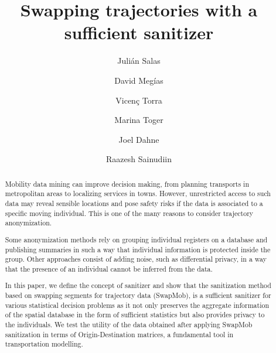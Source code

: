 \documentclass{llncs}
\begin{document}
\title{Swapping trajectories with a sufficient sanitizer}
\author{Juli\'an Salas
\and David Meg\'ias \and Vicen\c{c} Torra \and Marina Toger \and Joel Dahne \and Raazesh Sainudiin}


\maketitle

\begin{abstract}

Mobility data mining can improve decision making, from planning transports in metropolitan areas to localizing services in towns.
However, unrestricted access to such data may reveal sensible locations and pose safety risks if the data is associated to a specific moving individual. This is one of the many reasons to consider trajectory anonymization.


Some anonymization methods rely on grouping individual registers on a database and publishing summaries in such a way that individual information is protected inside the group.
Other approaches consist of adding noise, such as differential privacy, in a way that the presence of an individual cannot be inferred from the data.


In this paper, we define the concept of sanitizer and show that the sanitization method based on swapping segments for trajectory data (SwapMob), is a sufficient sanitizer for various statistical decision problems as it not only preserves the aggregate information of the spatial database in the form of sufficient statistics but also provides privacy to the individuals. 
We test the utility of the data obtained after applying SwapMob sanitization in terms of Origin-Destination matrices, a fundamental tool in  transportation modelling.

\end{abstract}
\end{document}
